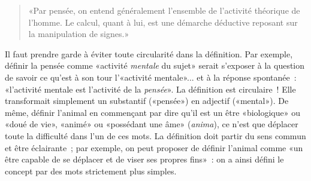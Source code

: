 \documentclass[a4paper,11pt]{article}
\begin{document}
\begin{quote}
  «Par pensée, on entend généralement l'ensemble de l'activité théorique
  de l'homme. Le calcul, quant à lui, est une démarche déductive
  reposant sur la manipulation de signes.»
\end{quote}

Il faut prendre garde à éviter toute circularité dans la définition. Par
exemple, définir la pensée comme «activité \emph{mentale} du sujet»
serait s'exposer à la question de savoir ce qu'est à son tour
l'«activité mentale»... et à la réponse spontanée~: «l'activité mentale
est l'activité de la \emph{pensée}». La définition est circulaire~! Elle
transformait simplement un substantif («pensée») en adjectif («mental»).
De même, définir l'animal en commençant par dire qu'il est un être
«biologique» ou «doué de vie», «animé» ou «possédant une âme»
(\emph{anima}), ce n'est que déplacer toute la difficulté dans l'un de
ces mots. La définition doit partir du sens commun et être éclairante~;
par exemple, on peut proposer de définir l'animal comme «un être capable
de se déplacer et de viser ses propres fins»~: on a ainsi défini le
concept par des mots strictement plus simples.

\par
\end{document}
